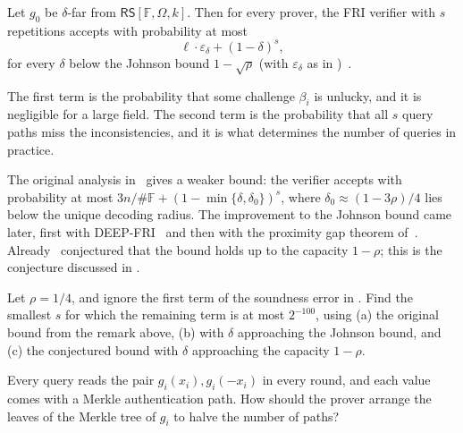\documentclass[../../book]{subfiles}
\begin{document}
\begin{theorem}\label{thm:fri-soundness}
    Let $g_0$ be $\delta$-far from $\mathsf{RS}[\mathbb{F}, \Omega, k]$.
    Then for every prover, the FRI verifier with $s$ repetitions accepts with probability at most
    \begin{equation*}
        \ell \cdot \varepsilon_\delta + (1 - \delta)^s,
    \end{equation*}
    for every $\delta$ below the Johnson bound $1 - \sqrt{\rho}$ (with $\varepsilon_\delta$ as in )~\cite{FOCS:BCIKS20}.
\end{theorem}

The first term is the probability that some challenge $\beta_i$ is unlucky, and it is negligible for a large field.
The second term is the probability that all $s$ query paths miss the inconsistencies, and it is what determines the number of queries in practice.

\begin{remark}
    The original analysis in~\cite[Theorem~3.3]{bensasson18} gives a weaker bound: the verifier accepts with probability at most $3n/\#\mathbb{F} + (1 - \min\{\delta, \delta_0\})^s$, where $\delta_0 \approx (1 - 3\rho)/4$ lies below the unique decoding radius.
    The improvement to the Johnson bound came later, first with DEEP-FRI~\cite{ITCS:BGKS20} %
    and then with the proximity gap theorem of~\cite{FOCS:BCIKS20}.
    Already~\cite[Conjecture~1.5]{bensasson18} conjectured that the bound holds up to the capacity $1 - \rho$; this is the conjecture discussed in .
\end{remark}

\begin{exercise}
    Let $\rho = 1/4$, and ignore the first term of the soundness error in .
    Find the smallest $s$ for which the remaining term is at most $2^{-100}$, using (a) the original bound from the remark above, (b)  with $\delta$ approaching the Johnson bound, and (c) the conjectured bound with $\delta$ approaching the capacity $1 - \rho$.

\end{exercise}

\begin{exercise}
    Every query reads the pair $g_i(x_i), g_i(-x_i)$ in every round, and each value comes with a Merkle authentication path.
    How should the prover arrange the leaves of the Merkle tree of $g_i$ to halve the number of paths?
\end{exercise}
\end{document}

